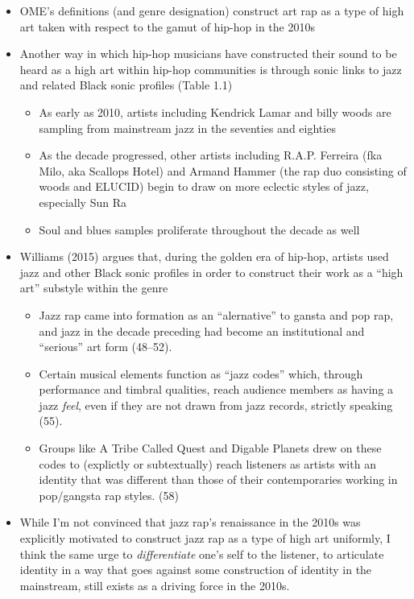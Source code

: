     \begin{itemize}
        \item OME's definitions (and genre designation) construct art rap as a type of high art taken with 
        respect to the gamut of hip-hop in the 2010s
        \item Another way in which hip-hop musicians have constructed their sound to be heard as a high art
        within  hip-hop communities is through sonic links to jazz and related Black sonic profiles (Table 1.1)
            \begin{itemize}
                \item As early as 2010, artists including Kendrick Lamar and billy woods are sampling 
                from  mainstream jazz in the seventies and eighties
                \item As the decade progressed, other artists including R.A.P. Ferreira (fka Milo, aka 
                Scallops Hotel)  and Armand Hammer (the rap duo consisting of woods and ELUCID) begin to 
                draw on more eclectic styles of jazz, especially Sun Ra
                \item Soul and blues samples proliferate throughout the decade as well
            \end{itemize}
        \item Williams (2015) argues that, during the golden era of hip-hop, artists used jazz and other 
        Black sonic profiles in order to construct their work as a ``high art'' substyle within the genre
            \begin{itemize}
                \item Jazz rap came into formation as an ``alernative'' to gansta and pop rap, and jazz in 
                the decade  preceding had become an institutional and ``serious'' art form (48--52).
                \item Certain musical elements function as ``jazz codes'' which, through performance and 
                timbral qualities, reach audience members as having a jazz \emph{feel}, even if they are 
                not drawn from jazz records, strictly speaking (55).
                \item Groups like A Tribe Called Quest and Digable Planets drew on these codes to (explictly 
                or subtextually) reach listeners as artists with an identity that was different than those of 
                their contemporaries working in pop/gangsta rap styles. (58)
            \end{itemize}        
        \item While I'm not convinced that jazz rap's renaissance in the 2010s was explicitly motivated to construct 
        jazz rap as a type of high art uniformly, I think the same urge to \emph{differentiate} one's self to the 
        listener, to articulate identity in a way that goes against some construction of identity in the mainstream, 
        still exists as a driving force in the 2010s.
    \end{itemize}
    
